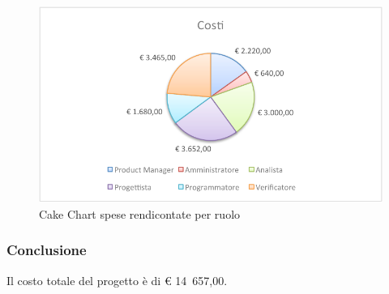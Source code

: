 				\begin{figure}[H]\centering
					\includegraphics[width=\textwidth]{PianoDiProgetto/Pics/ChartTotCostiRendic.pdf}
					\caption{Cake Chart spese rendicontate per ruolo}
				\end{figure}
		\subsubsection{Conclusione}
			Il costo totale del progetto è di \euro{} 14~657,00.
